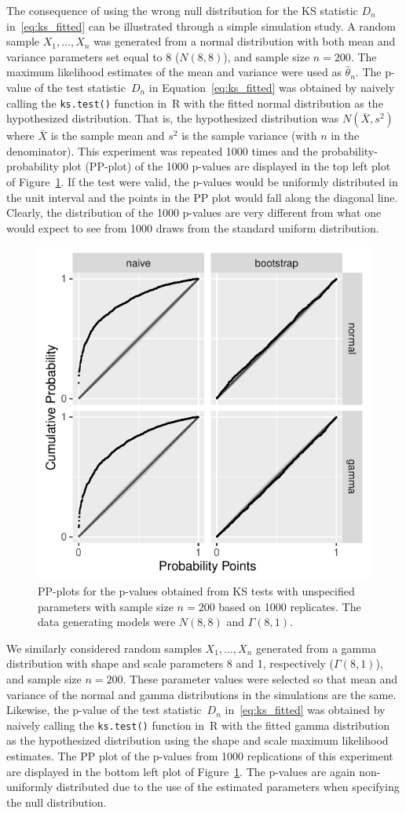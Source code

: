 \documentclass[12pt, letterpaper, titlepage]{article}
\begin{document}
The consequence of using the wrong null distribution for the KS statistic $D_n$
in~\eqref{eq:ks_fitted} can be illustrated through a simple simulation study. A
random sample $X_1, \ldots, X_n$ was generated from a normal
distribution with both mean and variance parameters set equal to 8 ($N(8,8)$), 
and sample size $n = 200$. The maximum likelihood estimates of the mean and 
variance were used as $\hat\theta_n$. The p-value of the test
statistic~$D_n$ in Equation~\eqref{eq:ks_fitted} was obtained by naively calling 
the \texttt{ks.test()} function in~R with the fitted normal distribution as the
hypothesized distribution. That is, the hypothesized distribution was
$N(\bar X, s^2)$ where $\bar X$ is the sample mean and $s^2$ is the sample
variance (with $n$ in the denominator). This experiment was repeated 1000 times
and the probability-probability plot (PP-plot) of the 1000 p-values are 
displayed in the top left plot of Figure~\ref{fig:pp_f}. If the test were
valid, the p-values would be uniformly distributed in the unit
interval and the points in the PP plot would fall along the diagonal line. 
Clearly, the distribution of the 1000 p-values are very different from what
one would expect to see from 1000 draws from the standard uniform
distribution.  


\begin{figure}[tbp]
  \centering
  \includegraphics[width=.5\textwidth]{pp_f.pdf}
  \caption{PP-plots for the p-values obtained from KS tests with unspecified
    parameters with sample size $n = 200$ based on 1000 replicates. The data
    generating models were $N(8, 8)$ and $\Gamma(8, 1)$.
  }
  \label{fig:pp_f}
\end{figure}


We similarly considered random samples $X_1, \ldots, X_n$ 
generated from a gamma distribution with shape and scale parameters 8 and 1, 
respectively ($\Gamma(8,1)$), and sample size $n=200$. These parameter values 
were selected so that mean and variance of the normal and gamma distributions 
in the simulations are the same. Likewise, the p-value of the test 
statistic~$D_n$ in~\eqref{eq:ks_fitted} was obtained by naively calling the
\texttt{ks.test()} function in~R with the fitted gamma distribution as the
hypothesized distribution using the shape and scale maximum likelihood 
estimates. The PP plot of the p-values from 1000 replications of this 
experiment are displayed in the bottom left plot of Figure~\ref{fig:pp_f}. The
p-values are again non-uniformly distributed due to the use of the 
estimated parameters when specifying the null distribution.
\end{document}
